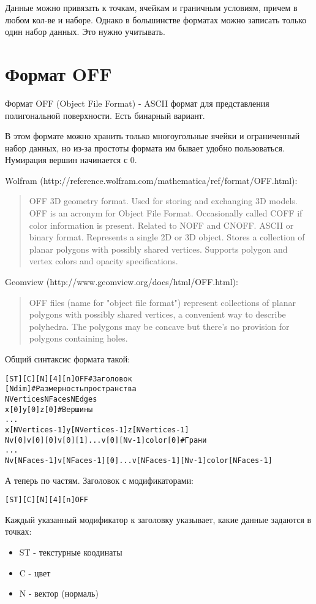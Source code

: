 \documentclass[a4paper,12pt]{article}
\begin{document}
Данные можно привязать к точкам, ячейкам и граничным условиям, причем в любом кол-ве и наборе. Однако в большинстве форматах можно записать только один набор данных. Это нужно учитывать.

\clearpage
\section{Формат OFF}

Формат OFF (Object File Format) - ASCII формат для представления полигональной поверхности. Есть бинарный вариант.

В этом формате можно хранить только многоугольные ячейки и ограниченный набор данных, но из-за простоты формата им бывает удобно пользоваться. Нумирация вершин начинается с 0.

Wolfram (http://reference.wolfram.com/mathematica/ref/format/OFF.html):
\begin{quote}
OFF 3D geometry format.
Used for storing and exchanging 3D models.
OFF is an acronym for Object File Format.
Occasionally called COFF if color information is present.
Related to NOFF and CNOFF.
ASCII or binary format.
Represents a single 2D or 3D object.
Stores a collection of planar polygons with possibly shared vertices.
Supports polygon and vertex colors and opacity specifications.
\end{quote}

Geomview (http://www.geomview.org/docs/html/OFF.html):
\begin{quote}
OFF files (name for "object file format") represent collections of planar polygons with possibly shared vertices, a convenient way to describe polyhedra. The polygons may be concave but there's no provision for polygons containing holes. 
\end{quote}

Общий синтаксис формата такой:

\begin{alltt}
[ST][C][N][4][n]OFF	# Заголовок
[Ndim]		# Размерность пространства
NVertices  NFaces  NEdges
x[0]  y[0]  z[0]	# Вершины
...
x[NVertices-1]  y[NVertices-1]  z[NVertices-1]
Nv[0]  v[0][0] v[0][1] ... v[0][Nv-1]  color[0] # Грани
...
Nv[NFaces-1]  v[NFaces-1][0] ... v[NFaces-1][Nv-1]  color[NFaces-1]
\end{alltt}

А теперь по частям. Заголовок с модификаторами:
\begin{alltt}
[ST][C][N][4][n]OFF
\end{alltt}
Каждый указанный модификатор к заголовку указывает, какие данные задаются в точках:
\begin{itemize}
\item ST - текстурные коодинаты
\item C - цвет
\item N - вектор (нормаль)
\end{itemize}
\end{document}
